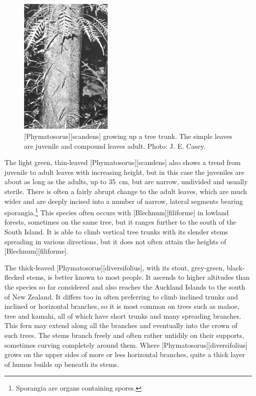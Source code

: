 \begin{figure}
	\includegraphics[width=0.4\textwidth]{graphics/figure29scandens.jpg}
	\centering
	\caption[\emph{Phymatosorus scandens} growing up a tree trunk]{[Phymatosorus][scandens] growing up a tree trunk.
The simple leaves are juvenile and compound leaves adult.
	Photo: J. E. Casey.}%
	\label{fig:29scandens}
\end{figure}

The light green, thin-leaved [Phymatosorus][scandens] also shows a trend from juvenile to adult leaves with increasing height, but in this case the juveniles are about as long as the adults, up to \SI{35}{\centi\metre}, but are narrow, undivided and usually sterile.
There is often a fairly abrupt change to the adult leaves, which are much wider and are deeply incised into a number of narrow, lateral segments bearing sporangia.\footnote{Sporangia are organs containing spores.}
This species often occurs with [Blechnum][filiforme] in lowland forests, sometimes on the same tree, but it ranges further to the south of the South Island.
It is able to climb vertical tree trunks with its slender stems spreading in various directions, but it does not often attain the heights of [Blechnum][filiforme].

The thick-leaved [Phymatosorus][diversifolius], with its stout, grey-green, black-flecked stems, is better known to most people.
It ascends to higher altitudes than the species so far considered and also reaches the Auckland Islands to the south of New Zealand.
It differs too in often preferring to climb inclined trunks and inclined or horizontal branches, so it is most common on trees such as mahoe, tree  and kamahi, all of which have short trunks and many spreading branches.
This fern may extend along all the branches and eventually into the crown of such trees.
The stems branch freely and often rather untidily on their supports, sometimes curving completely around them.
Where [Phymatosorus][diversifolius] grows on the upper sides of more or less horizontal branches, quite a thick layer of humus builds up beneath its stems.

